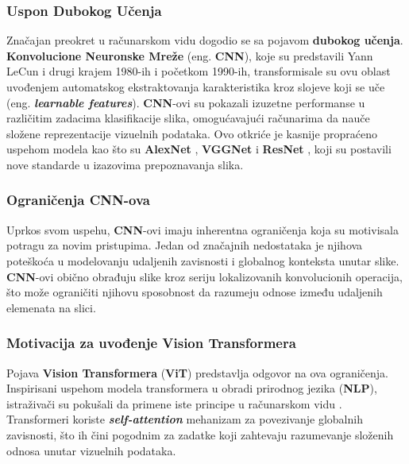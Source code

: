 \documentclass[12pt]{article}
\begin{document}
   \subsubsection{Uspon Dubokog Učenja}

   Značajan preokret u računarskom vidu dogodio se sa pojavom \textbf{dubokog učenja}. 
   \textbf{Konvolucione Neuronske Mreže} (eng. \textbf{CNN}), koje su predstavili Yann LeCun i drugi \cite{lecun_cnn} 
   krajem 1980-ih i početkom 1990-ih, transformisale su ovu oblast uvođenjem automatskog 
   ekstraktovanja karakteristika kroz slojeve koji se uče (eng. \textbf{\textit{learnable features}}). \textbf{CNN}-ovi su pokazali izuzetne 
   performanse u različitim zadacima klasifikacije slika, omogućavajući računarima da 
   nauče složene reprezentacije vizuelnih podataka. Ovo otkriće je kasnije propraćeno uspehom modela 
   kao što su \textbf{AlexNet} \cite{alexnet}, \textbf{VGGNet} \cite{vgg} i \textbf{ResNet} \cite{resnet}, koji su postavili nove standarde u izazovima 
   prepoznavanja slika.

   \subsubsection{Ograničenja CNN-ova}

   Uprkos svom uspehu, \textbf{CNN}-ovi imaju inherentna ograničenja \cite{cnn_limits} 
   koja su motivisala potragu za novim pristupima. Jedan od 
   značajnih nedostataka je njihova poteškoća u modelovanju udaljenih zavisnosti
   i globalnog konteksta unutar slike. \textbf{CNN}-ovi obično obrađuju slike kroz seriju 
   lokalizovanih konvolucionih operacija, što može ograničiti njihovu sposobnost da 
   razumeju odnose između udaljenih elemenata na slici.

   \subsubsection{Motivacija za uvođenje Vision Transformera}

   Pojava \textbf{Vision Transformera} (\textbf{ViT}) predstavlja odgovor na ova ograničenja. 
   Inspirisani uspehom modela transformera u obradi prirodnog jezika (\textbf{NLP}), 
   istraživači su pokušali da primene iste principe u računarskom vidu \cite{vit}. 
   Transformeri koriste \textbf{\textit{self-attention}} mehanizam za povezivanje globalnih zavisnosti, 
   što ih čini pogodnim za zadatke koji zahtevaju razumevanje 
   složenih odnosa unutar vizuelnih podataka.
   
\end{document}
